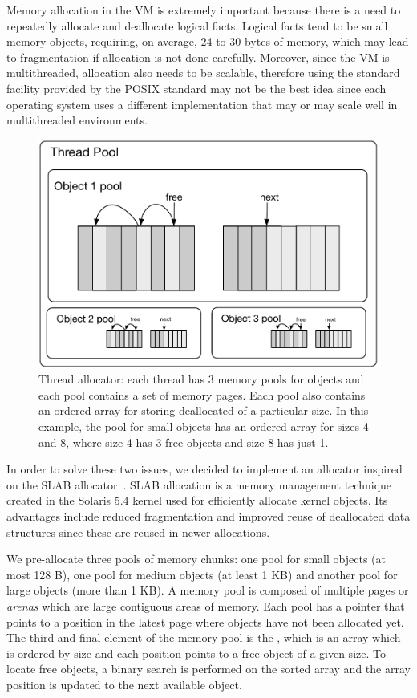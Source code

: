 
Memory allocation in the VM is extremely important because there is a need to
repeatedly allocate and deallocate logical facts. Logical facts tend to be small
memory objects, requiring, on average, 24 to 30 bytes of memory, which may lead
to fragmentation if allocation is not done carefully.  Moreover, since the VM is
multithreaded, allocation also needs to be scalable, therefore using the
standard  facility provided by the POSIX standard may not be the
best idea since each operating system uses a different implementation that may
or may scale well in multithreaded environments.

\begin{figure}[ht]
   \begin{center}
      \includegraphics[width=0.7\linewidth]{figures/implementation/pool.pdf}
   \end{center}
   \caption{Thread allocator: each thread has 3 memory pools for objects and
      each pool contains a set of memory pages. Each pool also contains an ordered array 
   for storing deallocated of a particular size. In this example, the pool for
small objects has an ordered array for sizes 4 and 8, where size 4 has 3 free
objects and size 8 has just 1.}
   \label{fig:implementation:pool}
\end{figure}

In order to solve these two issues, we decided to implement an allocator
inspired on the SLAB allocator~\cite{Bonwick-94}. SLAB allocation is a memory
management technique created in the Solaris 5.4 kernel used for efficiently
allocate kernel objects. Its advantages include reduced fragmentation and
improved reuse of deallocated data structures since these are reused in newer
allocations.

We pre-allocate three pools of memory chunks: one pool for small objects (at
most 128 B), one pool for medium objects (at least 1 KB) and another pool for
large objects (more than 1 KB).  A memory pool is composed of multiple pages or
\emph{arenas} which are large contiguous areas of memory. Each pool has
a  pointer that points to a position in the latest page where
objects have not been allocated yet. The third and final element of the memory
pool is the , which is an
array which is ordered by size and each position points to a free object of a
given size. To locate free objects, a binary search is performed on the sorted
array and the array position is updated to the next available object.


